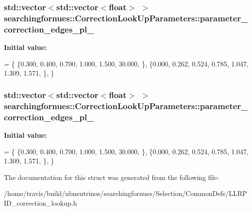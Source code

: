 \subsubsection[{\texorpdfstring{parameter\+\_\+correction\+\_\+edges\+\_\+pl\+\_\+1}{parameter_correction_edges_pl_1}}]{\setlength{\rightskip}{0pt plus 5cm}std\+::vector$<$std\+::vector$<$float$>$ $>$ searchingfornues\+::\+Correction\+Look\+Up\+Parameters\+::parameter\+\_\+correction\+\_\+edges\+\_\+pl\+\_}\hypertarget{structsearchingfornues_1_1CorrectionLookUpParameters_a42120e2dc25c42e794d1045c94fe0736}{}\label{structsearchingfornues_1_1CorrectionLookUpParameters_a42120e2dc25c42e794d1045c94fe0736}
{\bfseries Initial value\+:}
\begin{DoxyCode}
= \{
    \{0.300, 0.400, 0.700, 1.000, 1.500, 30.000, \},
    \{0.000, 0.262, 0.524, 0.785, 1.047, 1.309, 1.571, \},
    \}
\end{DoxyCode}
\subsubsection[{\texorpdfstring{parameter\+\_\+correction\+\_\+edges\+\_\+pl\+\_\+2}{parameter_correction_edges_pl_2}}]{\setlength{\rightskip}{0pt plus 5cm}std\+::vector$<$std\+::vector$<$float$>$ $>$ searchingfornues\+::\+Correction\+Look\+Up\+Parameters\+::parameter\+\_\+correction\+\_\+edges\+\_\+pl\+\_}\hypertarget{structsearchingfornues_1_1CorrectionLookUpParameters_ad0ce9fbdd38aad587b09a32a1129f251}{}\label{structsearchingfornues_1_1CorrectionLookUpParameters_ad0ce9fbdd38aad587b09a32a1129f251}
{\bfseries Initial value\+:}
\begin{DoxyCode}
= \{
    \{0.300, 0.400, 0.700, 1.000, 1.500, 30.000, \},
    \{0.000, 0.262, 0.524, 0.785, 1.047, 1.309, 1.571, \},
    \}
\end{DoxyCode}


The documentation for this struct was generated from the following file\+:\begin{DoxyCompactItemize}
\item 
/home/travis/build/ubneutrinos/searchingfornues/\+Selection/\+Common\+Defs/L\+L\+R\+P\+I\+D\+\_\+correction\+\_\+lookup.\+h\end{DoxyCompactItemize}
